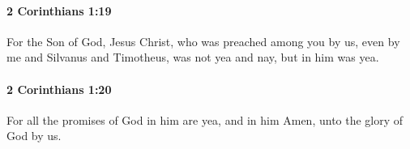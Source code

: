 		\paragraph{2 Corinthians 1:19} %
			\label{2CORINTHIANS-1-19}

			For the Son of God, Jesus Christ, who was preached among you by us, even by me and Silvanus and Timotheus, was not yea and nay, but in him was yea.

			\begin{framed}
			\scriptsize
				\begin{compactdesc}
					\item[SBLG] 
				\end{compactdesc}
			\end{framed}

		\paragraph{2 Corinthians 1:20} %
			\label{2CORINTHIANS-1-20}

			For all the promises of God in him are yea, and in him Amen, unto the glory of God by us.


